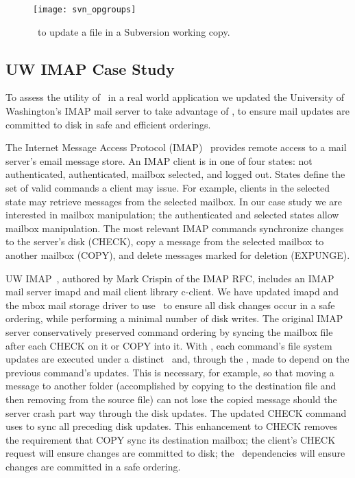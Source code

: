 \begin{figure}[htb]
  \centering
  \texttt{[image: svn\_opgroups]}
  \caption{\Opgroups\ to update a file in a Subversion working copy.}
  \label{fig:svn-order}
\end{figure}

\subsection{UW IMAP Case Study}
\label{sec:opgroup:uwimap}

To assess the utility of \opgroups\ in a real world application we
updated the University of Washington's IMAP mail server to take
advantage of \opgroups, to ensure mail updates are committed to disk
in safe and efficient orderings.

The Internet Message Access Protocol (IMAP)~\cite{rfc3501} provides
remote access to a mail server's email message store. An IMAP client
is in one of four states: not authenticated, authenticated, mailbox
selected, and logged out. States define the set of valid commands a
client may issue. For example, clients in the selected state may
retrieve messages from the selected mailbox. In our case study we are
interested in mailbox manipulation; the authenticated and selected
states allow mailbox manipulation. The most relevant IMAP commands
synchronize changes to the server's disk (CHECK), copy a message from
the selected mailbox to another mailbox (COPY), and delete messages
marked for deletion (EXPUNGE).

UW IMAP~\cite{uwimap}, authored by Mark Crispin of the IMAP RFC,
includes an IMAP mail server imapd and mail client library c-client.
We have updated imapd and the mbox mail storage driver to use
\opgroups\ to ensure all disk changes occur in a safe ordering, while
performing a minimal number of disk writes.
%
The original IMAP server conservatively preserved command ordering by
syncing the mailbox file after each CHECK on it or COPY into it. With
\opgroups, each command's file system updates are executed under a
distinct \opgroup\ and, through the \opgroup, made to depend on the
previous command's updates. This is necessary, for example, so that
moving a message to another folder (accomplished by copying to the
destination file and then removing from the source file) can not lose
the copied message should the server crash part way through the disk
updates.
%
The updated CHECK command uses \opgroupSync to sync all preceding disk
updates. This enhancement to CHECK removes the requirement that COPY
sync its destination mailbox; the client's CHECK request will ensure
changes are committed to disk; the \opgroup\ dependencies will ensure
changes are committed in a safe ordering.

